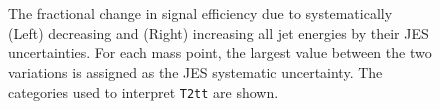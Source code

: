 \begin{figure}[h!]
  \begin{center}
    \\
    \\     
      \caption{\label{fig:sms-jes-t2tt}The fractional change in
      signal efficiency due to systematically (Left) decreasing and
      (Right) increasing all jet energies by their JES uncertainties. For
      each mass point, the largest value between the two variations is assigned
      as the JES systematic uncertainty. The categories used to interpret \texttt{T2tt} are shown.}
  \end{center}
\end{figure}

